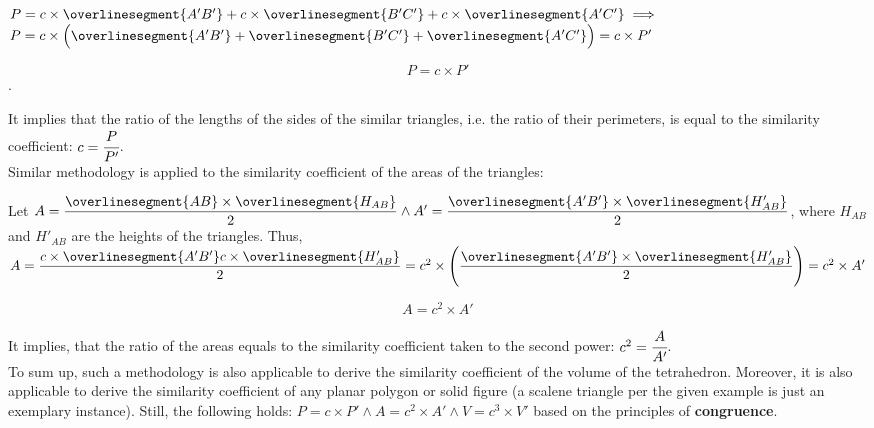 \documentclass[10pt,a4paper]{article}
\begin{document}
$P = c \times \overlinesegment{A'B'} + c \times \overlinesegment{B'C'} + c 
\times \overlinesegment{A'C'} \implies$
$P = c \times \Big( \overlinesegment{A'B'} + \overlinesegment{B'C'} + \overlinesegment{A'C'} \Big) = c \times P'$

$$P = c \times P'$$.

It implies that the ratio of the lengths of the sides of the similar triangles, 
i.e. the ratio of their perimeters, is equal to the similarity coefficient:
$c = \cfrac{P}{P'}$. \\

Similar methodology is applied to the similarity coefficient of the areas of the triangles:

Let $
A = \dfrac{\overlinesegment{AB} \times \overlinesegment{H_{AB}}}{2} \land 
A' = \dfrac{\overlinesegment{A'B'} \times \overlinesegment{H'_{AB}}}{2}$,
where $H_{AB}$ and $H'_{AB}$ are the heights of the triangles. Thus,
$A = \dfrac{c \times \overlinesegment{A'B'} c \times \overlinesegment{H'_{AB}}}{2} = 
c^2 \times \Bigg( \dfrac{\overlinesegment{A'B'} \times \overlinesegment{H'_{AB}}}{2} \Bigg) = c^2 \times A'$

$$A = c^2 \times A'$$

It implies, that the ratio of the areas equals to the similarity coefficient 
taken to the second power: $c^2 = \cfrac{A}{A'}$. \\

To sum up, such a methodology is also applicable to derive the similarity coefficient 
of the volume of the tetrahedron. Moreover, it is also applicable to derive the similarity coefficient
of any planar polygon or solid figure (a scalene triangle per the given example is just an exemplary instance). 
Still, the following holds: $P = c \times P' \land A = c^2 \times A' \land V = c^3 \times V'$ 
based on the principles of \textbf{congruence}.

\end{document}
